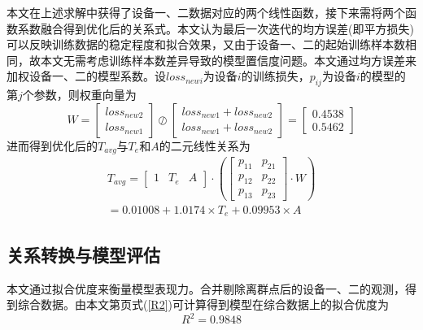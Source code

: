 \documentclass[withoutpreface,bwprint]{cumcmthesis}  %
\begin{document}
        本文在上述求解中获得了设备一、二数据对应的两个线性函数，接下来需将两个函数系数融合得到优化后的关系式。本文认为最后一次迭代的均方误差(即平方损失)可以反映训练数据的稳定程度和拟合效果，又由于设备一、二的起始训练样本数相同，故本文无需考虑训练样本数差异导致的模型置信度问题。本文通过均方误差来加权设备一、二的模型系数。设$loss_{newi}$为设备$i$的训练损失，$p_{ij}$为设备$i$的模型的第$j$个参数，则权重向量为
        \begin{equation}
        W=\begin{bmatrix}loss_{new2}\\loss_{new1}\end{bmatrix}\oslash\begin{bmatrix}loss_{new1}+loss_{new2}\\loss_{new1}+loss_{new2}\end{bmatrix}=\begin{bmatrix}0.4538\\0.5462\end{bmatrix}
        \end{equation}
        进而得到优化后的$T_{avg}$与$T_{e}$和$A$的二元线性关系为
        \begin{align}\label{TTA}
            T_{avg}=\begin{bmatrix}1 & T_{e} &A\end{bmatrix}\cdot 
            (\begin{bmatrix}p_{11}& p_{21}\\p_{12}& p_{22}\\p_{13}&p_{23}\end{bmatrix}\cdot W)\\=0.01008+1.0174\times T_{e}+0.09953\times A
        \end{align}

	\subsection{关系转换与模型评估}
        本文通过拟合优度来衡量模型表现力。合并剔除离群点后的设备一、二的观测，得到综合数据。由本文第\pageref{R2}页式(\ref{R2})可计算得到模型在综合数据上的拟合优度为
        \[R^{2}=0.9848\]
\end{document}
